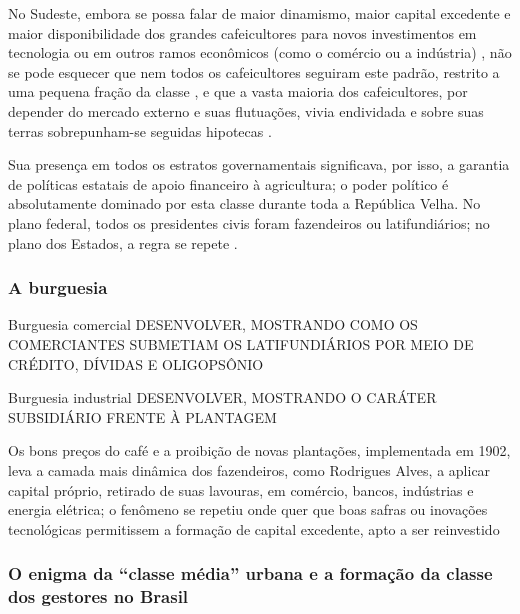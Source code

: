 No Sudeste, embora se possa falar de maior dinamismo, maior capital excedente e maior disponibilidade dos grandes cafeicultores para novos investimentos em tecnologia ou em outros ramos econômicos (como o comércio ou a indústria) \cite[p.~153-154]{CARONE1970inst}, não se pode esquecer que nem todos os cafeicultores seguiram este padrão, restrito a uma pequena fração da classe \cite[p.~32-38]{gorender_burguesia_1990}, e que a vasta maioria dos cafeicultores, por depender do mercado externo e suas flutuações, vivia endividada e sobre suas terras sobrepunham-se seguidas hipotecas \cite[p.~154]{CARONE1970inst}. 

Sua presença em todos os estratos governamentais significava, por isso, a garantia de políticas estatais de apoio financeiro à agricultura; o poder político é absolutamente dominado por esta classe durante toda a República Velha. No plano federal, todos os presidentes civis foram fazendeiros ou latifundiários; no plano dos Estados, a regra se repete \cite[p.~155]{CARONE1970inst}.

\subsubsection{A burguesia}\label{subsubsec:claburg}

Burguesia comercial DESENVOLVER, MOSTRANDO COMO OS COMERCIANTES SUBMETIAM OS LATIFUNDIÁRIOS POR MEIO DE CRÉDITO, DÍVIDAS E OLIGOPSÔNIO

Burguesia industrial DESENVOLVER, MOSTRANDO O CARÁTER SUBSIDIÁRIO FRENTE À PLANTAGEM

Os bons preços do café e a proibição de novas plantações, implementada em 1902, leva a camada mais dinâmica dos fazendeiros, como Rodrigues Alves, a aplicar capital próprio, retirado de suas lavouras, em comércio, bancos, indústrias e energia elétrica; o fenômeno se repetiu onde quer que boas safras ou inovações tecnológicas permitissem a formação de capital excedente, apto a ser reinvestido \cite[p.~147]{CARONE1970inst}

\subsubsection{O enigma da ``classe média'' urbana e a formação da classe dos gestores no Brasil}\label{subsubsec:clamed}

